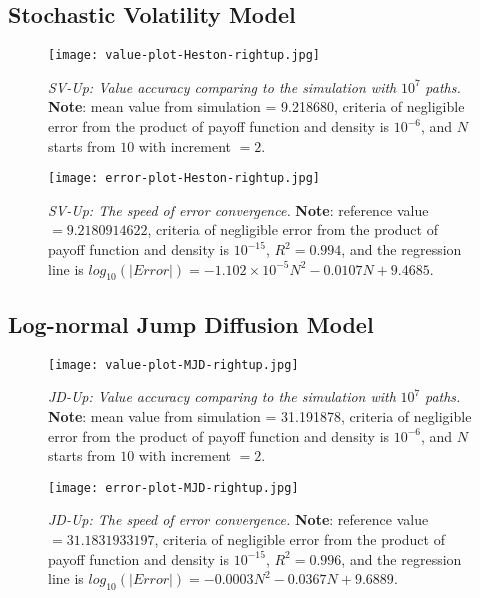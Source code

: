 \subsection{Stochastic Volatility Model}
\begin{figure}[H]
    \centering
    \texttt{[image: value-plot-Heston-rightup.jpg]}
    \caption[\emph{SV-Up: Value accuracy comparing to the simulation with} $10^7$ \emph{paths.}]{\emph{SV-Up: Value accuracy comparing to the simulation with} $10^7$ \emph{paths.} \textbf{Note}: mean value from simulation = 9.218680, criteria of negligible error from the product of payoff function and density is $10^{-6}$, and $N$ starts from $10$  with increment $=2$.}

    \label{fig:label}
\end{figure}
\begin{figure}[H]
    \centering
    \texttt{[image: error-plot-Heston-rightup.jpg]}
    \caption[\emph{SV-Up: The speed of error convergence.}]{\emph{SV-Up: The speed of error convergence.} \textbf{Note}: reference value $=9.2180914622$, criteria of negligible error from the product of payoff function and density is $10^{-15}$, $R^2=0.994$, and the regression line is $log_{10}\left(|Error|\right) = -1.102\times 10^{-5}N^2-0.0107N+9.4685$.}
    
    \label{fig:label}
\end{figure}




\subsection{Log-normal Jump Diffusion Model}
\begin{figure}[H]
    \centering
    \texttt{[image: value-plot-MJD-rightup.jpg]}
    \caption[\emph{JD-Up: Value accuracy comparing to the simulation with} $10^7$ \emph{paths.}]{\emph{JD-Up: Value accuracy comparing to the simulation with} $10^7$ \emph{paths.} \textbf{Note}: mean value from simulation = 31.191878, criteria of negligible error from the product of payoff function and density is $10^{-6}$, and $N$ starts from $10$  with increment $=2$.}
    
    \label{fig:label}
\end{figure}

\begin{figure}[H]
    \centering
    \texttt{[image: error-plot-MJD-rightup.jpg]}
    \caption[\emph{JD-Up: The speed of error convergence.}]{\emph{JD-Up: The speed of error convergence.} \textbf{Note}: reference value $=31.1831933197$, criteria of negligible error from the product of payoff function and density is $10^{-15}$, $R^2=0.996$, and the regression line is $log_{10}\left(|Error|\right) = -0.0003N^2-0.0367N+9.6889$.}

    \label{fig:label}
\end{figure}


